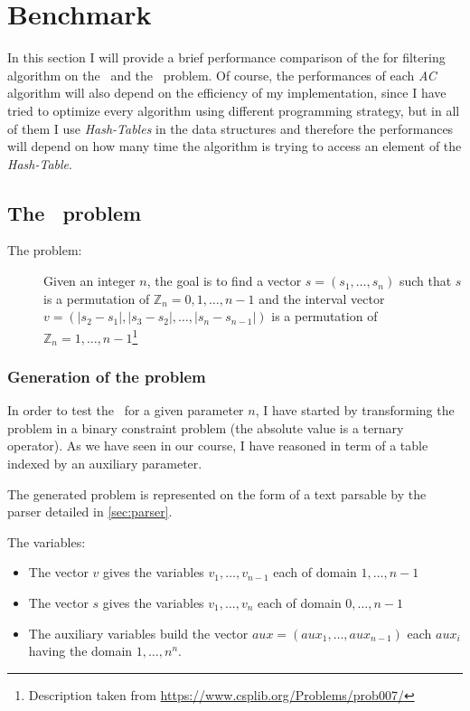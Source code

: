 \documentclass{rapport}
\begin{document}
\section{Benchmark}

In this section I will provide a brief performance comparison of the for filtering algorithm on the \allint\ and the \queens\ problem. Of course, the performances of each \textit{AC} algorithm will also depend on the efficiency of my implementation, since I have tried to optimize every algorithm using different programming strategy, but in all of them I use \textit{Hash-Tables} in the data structures and therefore the performances will depend on how many time the algorithm is trying to access an element of the \textit{Hash-Table}.

\subsection{The \allint\ problem}

\begin{description}
  \item[The problem:] Given an integer $n$, the goal is to find a vector $s = (s_1, \dots, s_n)$ such that $s$ is a permutation of $\mathbb{Z}_n = 0, 1, \dots, n - 1$ and the interval vector $v = (|s_2-s_1|, |s_3-s_2|,\dots, |s_n-s_{n-1}|)$ is a permutation of $\mathbb{Z}_n = 1, \dots, n - 1$\footnote{Description taken from \url{https://www.csplib.org/Problems/prob007/}}
\end{description}

\subsubsection{Generation of the problem}
\label{sec:allIntGen}

In order to test the \allint\ for a given parameter $n$, I have started by transforming the problem in a binary constraint problem (the absolute value is a ternary operator). As we have seen in our course, I have reasoned in term of a table indexed by an auxiliary parameter.

The generated problem is represented on the form of a text parsable by the parser detailed in \cref{sec:parser}.

The variables:

\begin{itemize}
  \item The vector $v$ gives the variables $v_1, \dots, v_{n-1}$ each of domain $1, \dots, n - 1$
  \item The vector $s$ gives the variables $v_1, \dots, v_{n}$ each of domain $0, \dots, n - 1$
  \item The auxiliary variables build the vector $aux = (aux_1, \dots, aux_{n-1})$ each $aux_i$ having the domain $1, \dots, n^n$.
\end{itemize}
\end{document}
